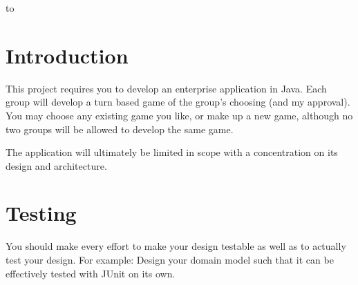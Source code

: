 \documentclass[11pt]{exam}
\begin{document}
\begin{center} 
\end{center} 

\lstset{language=Python,numbers=left}

\vspace{0.1in} 
\hbox to \textwidth{Name:\enspace\hrulefill} 



\section{Introduction}
This project requires you to develop an enterprise application in Java.   Each group will develop a turn based game of the group's choosing (and my approval).   You may choose any existing game you like, or make up a new game, although no two groups will be allowed to develop the same game.
\par
The application will ultimately be limited in scope with a concentration on its design and architecture.

\section{Testing}
You should make every effort to make your design testable as well as to actually test your design.   For example: Design your domain model such that it can be effectively tested with JUnit on its own.
\end{document}
